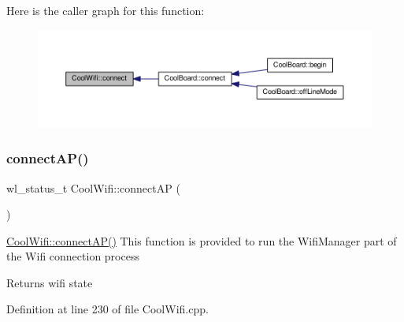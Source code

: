 Here is the caller graph for this function\+:\nopagebreak
\begin{figure}[H]
\begin{center}
\leavevmode
\includegraphics[width=350pt]{d7/d29/class_cool_wifi_ad060353050f40d032a2dbf9e54a768bf_icgraph}
\end{center}
\end{figure}
\mbox{\label{class_cool_wifi_a7c857f27161782f5ef1d62d552aff971}} 
\subsubsection{\texorpdfstring{connect\+A\+P()}{connectAP()}}
{\footnotesize\ttfamily wl\+\_\+status\+\_\+t Cool\+Wifi\+::connect\+AP (\begin{DoxyParamCaption}{ }\end{DoxyParamCaption})}

\hyperlink{class_cool_wifi_a7c857f27161782f5ef1d62d552aff971}{Cool\+Wifi\+::connect\+A\+P()} This function is provided to run the Wifi\+Manager part of the Wifi connection process

\begin{DoxyReturn}{Returns}
wifi state 
\end{DoxyReturn}


Definition at line 230 of file Cool\+Wifi.\+cpp.


